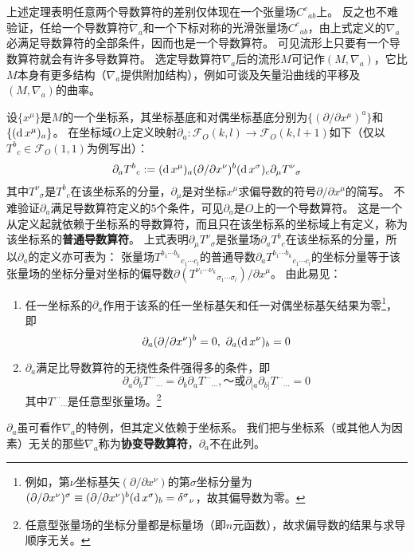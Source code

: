 上述定理表明任意两个导数算符的差别仅体现在一个张量场$C^c{}_{ab}$上。
反之也不难验证，任给一个导数算符$\tilde\nabla_a$和一个下标对称的光滑张量场$C^c{}_{ab}$，由上式定义的$\nabla_a$必满足导数算符的全部条件，因而也是一个导数算符。
可见流形上只要有一个导数算符就会有许多导数算符。
选定导数算符$\nabla_a$后的流形$M$可记作$(M, \nabla_a)$，它比$M$本身有更多结构（$\nabla_a$提供附加结构），例如可谈及矢量沿曲线的平移及$(M, \nabla_a)$的曲率。

设$\{x^\mu\}$是$M$的一个坐标系，其坐标基底和对偶坐标基底分别为$\{(\partial / \partial x^\mu)^a\}$和$\{(\operatorname{d} x^\mu)_a\}$。
在坐标域$O$上定义映射$\partial_a \colon \mathscr{F}_O(k, l) \to \mathscr{F}_O(k, l + 1)$如下（仅以$T^b{}_c \in \mathscr{F}_O(1, 1)$为例写出）：
$$\partial_aT^b{}_c := (\operatorname{d} x^\mu)_a(\partial / \partial x^\nu)^b(\operatorname{d} x^\sigma)_c\partial_\mu T^\nu{}_\sigma$$
其中$T^\nu{}_\sigma$是$T^b{}_c$在该坐标系的分量，$\partial_\mu$是对坐标$x^\mu$求偏导数的符号$\partial / \partial x^\mu$的简写。
不难验证$\partial_a$满足导数算符定义的$5$个条件，可见$\partial_a$是$O$上的一个导数算符。
这是一个从定义起就依赖于坐标系的导数算符，而且只在该坐标系的坐标域上有定义，称为该坐标系的\textbf{普通导数算符}。
上式表明$\partial_\mu T^\nu{}_\sigma$是张量场$\partial_aT^b{}_c$在该坐标系的分量，所以$\partial_a$的定义亦可表为：
张量场$T^{b_1 \cdots b_k}{}_{c_1 \cdots c_l}$的普通导数$\partial_aT^{b_1 \cdots b_k}{}_{c_1 \cdots c_l}$的坐标分量等于该张量场的坐标分量对坐标的偏导数$\partial(T^{\nu_1 \cdots \nu_k}{}_{\sigma_1 \cdots \sigma_l}) / \partial x^\mu$。
由此易见：

\begin{enumerate}[（1）]
\item 任一坐标系的$\partial_a$作用于该系的任一坐标基矢和任一对偶坐标基矢结果为零\footnote{
例如，第$\nu$坐标基矢$(\partial / \partial x^\nu)$的第$\sigma$坐标分量为$(\partial / \partial x^\nu)^\sigma \equiv (\partial / \partial x^\nu)^b(\operatorname{d} x^\sigma)_b = \delta^\sigma{}_\nu$，故其偏导数为零。
}，即
$$\partial_a(\partial / \partial x^\nu)^b = 0, ~ \partial_a(\operatorname{d} x^\nu)_b = 0$$
\item $\partial_a$满足比导数算符的无挠性条件强得多的条件，即
$$\partial_a\partial_bT^{\cdots}{}_{\cdots} = \partial_b\partial_aT^{\cdots}{}_{\cdots}, ～ \text{或} \partial_{[a}\partial_{b]}T^{\cdots}{}_{\cdots} = 0$$
其中$T^{\cdots}{}_{\cdots}$是任意型张量场。\footnote{
任意型张量场的坐标分量都是标量场（即$n$元函数），故求偏导数的结果与求导顺序无关。
}
\end{enumerate}

$\partial_a$虽可看作$\nabla_a$的特例，但其定义依赖于坐标系。
我们把与坐标系（或其他人为因素）无关的那些$\nabla_a$称为\textbf{协变导数算符}，$\partial_a$不在此列。

